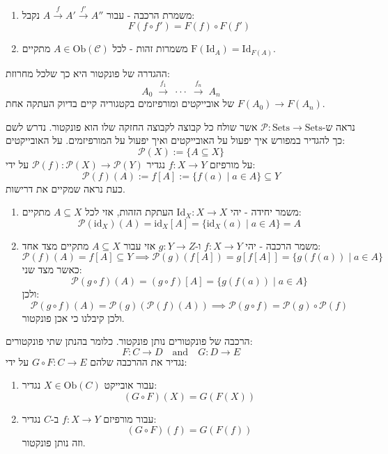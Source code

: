 \documentclass{tstextbook}
\begin{document}
\begin{enumerate}
  \item משמרת הרכבה - עבור \(A\xrightarrow{f}A'\xrightarrow{f'}A''\) נקבל: 
$$F(f\circ f')=F(f)\circ F(f')$$


  \item משמרות זהות - לכל \(A \in \mathrm{Ob}(\mathcal{C})\) מתקיים \(\mathrm{F}(\mathrm{Id}_{A})=\mathrm{Id}_{F(A)}\). 


\end{enumerate}
\begin{remark}
ההגדרה של פונקטור היא כך שלכל מחרוזת:
$$A_{0}\;{\xrightarrow{\ f_{1}\ }}\;\cdot\cdot\cdot\;{\xrightarrow{\ f_{n}\ }}\;A_{n}$$
של אובייקטים ומורפיזמים בקטגוריה קיים בדיוק העתקה אחת \(F(A_{0})\to F(A_{n})\).

\end{remark}
\begin{example}
נראה ש-\(\mathcal{P}:\mathrm{Sets}\to \mathrm{Sets}\) אשר שולח כל קבוצה לקבוצה החזקה שלו הוא פונקטור. נדרש לשם כך להגדיר במפורש איך יפעול על האובייקטים ואיך יפעול על המורפיזמים. על האובייקטים:
$${\mathcal{P}}(X):=\{A\subseteq X\}$$
על מורפיזם \(f:X\to Y\) נגדיר \({\mathcal{P}}(f):{\mathcal{P}}(X)\to{\mathcal{P}}(Y)\) על ידי:
$${\mathcal{P}}(f)(A):=f[A]:=\{f(a)\mid a\in A\}\subseteq Y$$
כעת נראה שמקיים את דרישות.

  \begin{enumerate}
    \item משמר יחידה - יהי \(\mathrm{Id}_{X}:X\to X\) העתקת הזהות, אזי לכל \(A\subseteq X\) מתקיים: 
$${\mathcal{P}}({\mathrm{id}}_{X})(A)={\mathrm{id}}_{X}[A]=\{{\mathrm{id}}_{X}(a)\mid a\in A\}=A$$


    \item משמר הרכבה - יהי \(f:X\to Y\) ו-\(g:Y\to Z\) אזי עבור \(A\subseteq X\) מתקיים מצד אחד: 
$${\mathcal{P}}(f)(A)=f[A]\subseteq Y\implies {\mathcal{P}}(g)(f[A])=g[f[A]]=\{g(f(a))\mid a\in A\}$$
כאשר מצד שני:
$${\mathcal{P}}(g\circ f)(A)=(g\circ f)[A]=\{g(f(a))\mid a\in A\}$$
ולכן:
$${\mathcal{P}}\left( g\circ f \right)(A)={\mathcal{P}}(g)\left( {\mathcal{P}}(f)(A) \right)\implies {\mathcal{P}}(g\circ f)={\mathcal{P}}(g)\circ{\mathcal{P}}(f)$$
ולכן קיבלנו כי אכן פונקטור.


  \end{enumerate}
\end{example}
\begin{proposition}
הרכבה של פונקטורים נותן פונקטור. כלומר בהנתן שתי פונקטורים:
$$F:C\to D\quad{\mathrm{and}}\quad G:D\to E$$
נגדיר את ההרכבה שלהם \(G\circ F:C\to E\) על ידי:

  \begin{enumerate}
    \item עבור אובייקט \(X \in \mathrm{Ob}(C)\) נגדיר: 
$$(G\circ F)(X)=G(F(X))$$


    \item עבור מורפיזם \(f:X\to Y\) ב-\(C\) נגדיר: 
$$(G\circ F)(f)=G(F(f))$$
וזה נותן פונקטור.


  \end{enumerate}
\end{proposition}
\end{document}
